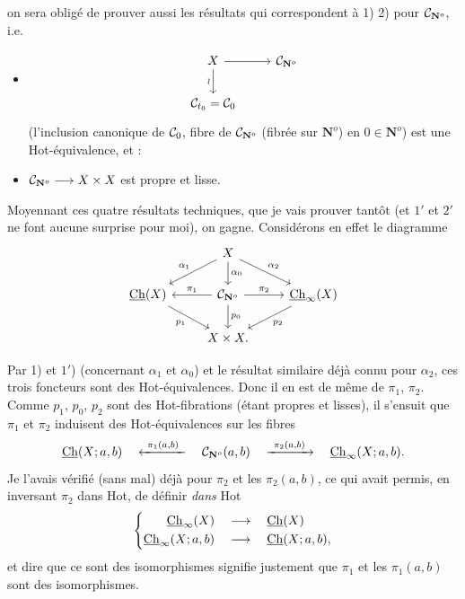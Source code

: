 on sera obligé de prouver aussi les résultats qui correspondent à 1) 2) pour $\mathcal{C}_{\mathbf{N}^{o}}$, i.e.

\begin{itemize}[label={}]
\item[1$'$)]
\[
\begin{tikzcd}
X \ar[r] \ar[d,"\wr"'] & \cC_{\NN} \\
\cC_{t_0} = \cC_0 &
\end{tikzcd}
\]
(l'inclusion canonique de $\mathcal{C}_0$, fibre de $\mathcal{C}_{\mathbf{N}^{o}}$ (fibrée sur $\mathbf{N}^o$) en $0 \in \mathbf{N}^o$) est une Hot-équivalence, et :

\item[2$'$)] $\mathcal{C}_{\mathbf{N}^{o}} \longrightarrow X \times X$ est propre et lisse.
\end{itemize}

Moyennant ces quatre résultats techniques, que je vais prouver tantôt (et $1'$ et $2'$ ne font aucune surprise pour moi), on gagne. Considérons en effet le diagramme
\[
\begin{tikzcd}
& X \ar[dl,"\alpha_1"'] \ar[d,"\alpha_0"] \ar[dr,"\alpha_2"] & \\
\Ch(X) \ar[dr,"p_1"'] & \cC_{\NN} \ar[l,"\pi_1"'] \ar[r,"\pi_2"] \ar[d,"p_0"] & \Ch_{\infty}(X) \ar[dl,"p_2"] \\
& X \times X. &
\end{tikzcd}
\]

Par 1) et $1'$) (concernant $\alpha_1$ et $\alpha_0$) et le résultat
similaire déjà connu pour $\alpha_2$, ces trois foncteurs sont des Hot-équivalences. Donc il en est de même de $\pi_1$, $\pi_2$. Comme $p_1$, $p_0$, $p_2$ sont des Hot-fibrations (étant propres et lisses), il s'ensuit que $\pi_1$ et $\pi_2$ induisent des Hot-équivalences sur les fibres
\[
\underline{\mathrm{Ch}}(X;a,b) \quad \xleftarrow{\ \pi_1(a,b)\ } \quad \mathcal{C}_{\mathbf{N}^{o}}(a,b) \quad \xrightarrow{\ \pi_2(a,b)\ } \quad \underline{\mathrm{Ch}}_{\infty}(X;a,b).
\]
Je l'avais vérifié (sans mal) déjà pour $\pi_2$ et les $\pi_2(a,b)$, ce qui avait permis, en inversant $\pi_2$ dans Hot, de définir \textit{dans} Hot
\[
\left\{
\begin{aligned}
\underline{\mathrm{Ch}}_{\infty}(X) &\quad\longrightarrow\quad \underline{\mathrm{Ch}}(X) \\
\underline{\mathrm{Ch}}_{\infty}(X;a,b) &\quad\longrightarrow\quad \underline{\mathrm{Ch}}(X;a,b),
\end{aligned}
\right.
\]
et dire que ce sont des isomorphismes signifie justement que $\pi_1$ et les $\pi_1(a,b)$ sont des isomorphismes.

